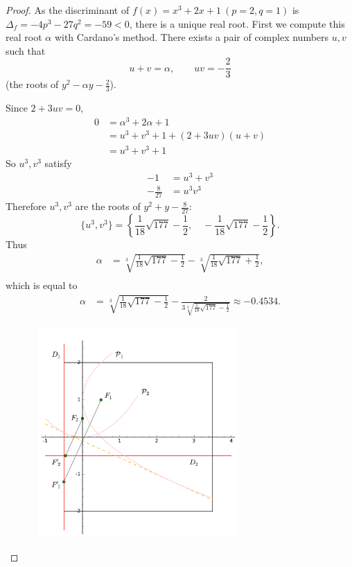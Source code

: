 \documentclass[11pt,a4paper]{article}
\begin{document}
\begin{proof}
As the discriminant of  $f(x) = x^3+2x+1\ (p=2,q=1)$ is $\Delta_f = -4p^3-27q^2 = -59<0$, there is a unique real root.
First we compute this real root $\alpha$ with Cardano's method. There exists a pair of complex numbers $u,v$ such that
$$ u+v = \alpha, \qquad uv = -\frac{2}{3}$$
(the roots of $y^2 - \alpha y -\frac{2}{3}$).

Since $2+3uv=0$,
\begin{align*}
0 &= \alpha^3+2\alpha+1\\
&= u^3+v^3+1+ (2 + 3 uv)(u+v)\\
&= u^3+v^3+1
\end{align*}
So $u^3,v^3$ satisfy
\begin{align*}
-1 &=u^3 + v^3 \\
-\frac{8}{27} &=u^3v^3 
\end{align*}
Therefore $u^3,v^3$ are the roots of $y^2 +y - \frac{8}{27}$:
$$\{u^3,v^3\} = \left \{\frac{1}{18} \sqrt{177} - \frac{1}{2},\quad - \frac{1}{18} \sqrt{177} - \frac{1}{2}\right \}.$$
Thus
\begin{align*}
\alpha &= \sqrt[3]{\frac{1}{18} \sqrt{177} - \frac{1}{2}} - \sqrt[3]{\frac{1}{18} \sqrt{177} + \frac{1}{2}},\\
\end{align*}
which is equal to
\begin{align*}
\alpha &= \sqrt[3]{\frac{1}{18} \sqrt{177} - \frac{1}{2}} - \frac{2}{3 \sqrt[3]{\frac{1}{18} \sqrt{177} - \frac{1}{2}}} \approx -0.4534.
\end{align*}

\begin{figure}[htbp]
\begin{center}
\includegraphics [width=8cm,height=8cm] {cubic_equation.pdf}
\end{center}
\end{figure}


\end{proof}
\end{document}
